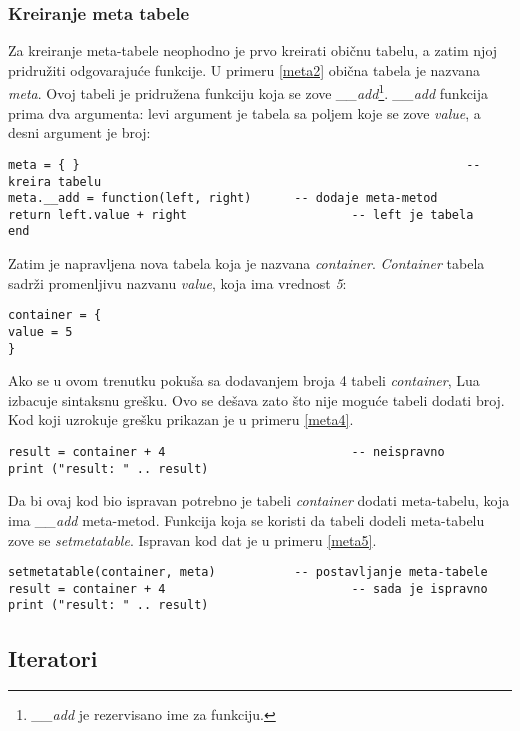 \documentclass[a4paper]{article}
\begin{document}
\subsubsection*{Kreiranje meta tabele}
Za kreiranje meta-tabele neophodno je prvo kreirati običnu tabelu, a zatim njoj pridružiti odgovarajuće funkcije. U primeru \ref{meta2} obična tabela je nazvana \textit{meta}. Ovoj tabeli je pridružena funkciju koja se zove \textit{\_\_add}\footnote{\textit{\_\_add} je rezervisano ime za funkciju.}. \textit{\_\_add} funkcija prima dva argumenta: levi argument je tabela sa poljem koje se zove \textit{value}, a desni argument je broj:
\begin{lstlisting}[caption={Kreiranje meta-tabele i dodavanje meta-metoda},frame=single, label=meta2]
meta = { } 														-- kreira tabelu
meta.__add = function(left, right)		-- dodaje meta-metod
return left.value + right 						-- left je tabela
end
\end{lstlisting}
Zatim je napravljena nova tabela koja je nazvana \textit{container}. \textit{Container} tabela sadrži promenljivu nazvanu \textit{value}, koja ima vrednost \textit{5}:
\begin{lstlisting}[caption={Tabela \textit{container}},frame=single, label=meta3]
container = {
value = 5
}
\end{lstlisting}
Ako se u ovom trenutku pokuša sa dodavanjem broja 4 tabeli \textit{container}, Lua izbacuje sintaksnu grešku. Ovo se dešava zato što nije moguće tabeli dodati broj. Kod koji uzrokuje grešku prikazan je u primeru \ref{meta4}.
\begin{lstlisting}[caption={Neispravno sabiranje tabele i broja},frame=single, label=meta4]
result = container + 4 							-- neispravno
print ("result: " .. result)
\end{lstlisting}
Da bi ovaj kod bio ispravan potrebno je tabeli \textit{container} dodati meta-tabelu, koja ima \textit{\_\_add} meta-metod. Funkcija koja se koristi da tabeli dodeli meta-tabelu zove se \textit{setmetatable}. Ispravan kod dat je u primeru \ref{meta5}.
\begin{lstlisting}[caption={Ispravno sabiranje tabele i broja},frame=single, label=meta5]
setmetatable(container, meta) 			-- postavljanje meta-tabele
result = container + 4 							-- sada je ispravno
print ("result: " .. result)
\end{lstlisting}

\subsection*{Iteratori}
\end{document}
